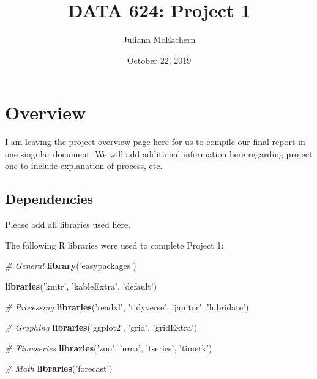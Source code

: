 \documentclass[openany]{book}
\title{DATA 624: Project 1}
\author{Juliann McEachern}
\date{October 22, 2019}
\newenvironment{Shaded}{\begin{snugshade}}{\end{snugshade}}
\newcommand{\CommentTok}[1]{\textcolor[rgb]{0.56,0.35,0.01}{\textit{#1}}}
\newcommand{\KeywordTok}[1]{\textcolor[rgb]{0.13,0.29,0.53}{\textbf{#1}}}
\newcommand{\NormalTok}[1]{#1}
\newcommand{\StringTok}[1]{\textcolor[rgb]{0.31,0.60,0.02}{#1}}
\renewenvironment{quote}{\begin{myquote}}{\end{myquote}}
\begin{document}
\maketitle

{
\setcounter{tocdepth}{1}
\tableofcontents
}
\hypertarget{overview}{%
\chapter*{Overview}\label{overview}}

\begin{quote}
I am leaving the project overview page here for us to compile our final
report in one singular document. We will add additional information here
regarding project one to include explanation of process, etc.
\end{quote}

\hypertarget{dependencies}{%
\section*{Dependencies}\label{dependencies}}

\begin{quote}
Please add all libraries used here.
\end{quote}

The following R libraries were used to complete Project 1:

\begin{Shaded}
\begin{Highlighting}[]
\CommentTok{# General}
\KeywordTok{library}\NormalTok{(}\StringTok{'easypackages'}\NormalTok{)}

\KeywordTok{libraries}\NormalTok{(}\StringTok{'knitr'}\NormalTok{, }\StringTok{'kableExtra'}\NormalTok{, }\StringTok{'default'}\NormalTok{)}

\CommentTok{# Processing}
\KeywordTok{libraries}\NormalTok{(}\StringTok{'readxl'}\NormalTok{, }\StringTok{'tidyverse'}\NormalTok{, }\StringTok{'janitor'}\NormalTok{, }\StringTok{'lubridate'}\NormalTok{)}

\CommentTok{# Graphing}
\KeywordTok{libraries}\NormalTok{(}\StringTok{'ggplot2'}\NormalTok{, }\StringTok{'grid'}\NormalTok{, }\StringTok{'gridExtra'}\NormalTok{)}

\CommentTok{# Timeseries }
\KeywordTok{libraries}\NormalTok{(}\StringTok{'zoo'}\NormalTok{, }\StringTok{'urca'}\NormalTok{, }\StringTok{'tseries'}\NormalTok{, }\StringTok{'timetk'}\NormalTok{)}

\CommentTok{# Math}
\KeywordTok{libraries}\NormalTok{(}\StringTok{'forecast'}\NormalTok{)}
\end{Highlighting}
\end{Shaded}
\end{document}
